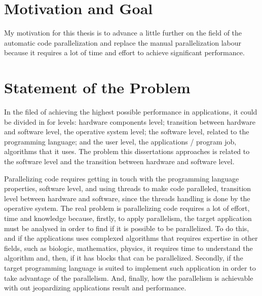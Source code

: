 
\section{Motivation and Goal} \label{sec:goals}

My motivation for this thesis is to advance a little further on the field of the automatic code parallelization  and replace the manual parallelization labour because it requires a lot of time and effort to achieve significant performance.



\section{Statement of the Problem}

In the filed of achieving the highest possible performance in applications, it could be divided in for levels: hardware components level; transition between hardware and software level, the operative system level; the software level, related to the programming language; and the user level, the applications / program job, algorithms that it uses. The problem this dissertations approaches is related to the software level and the transition between hardware and software level.

Parallelizing code requires getting in touch with the programming language properties, software level, and using threads to make code paralleled, transition level between hardware and software,  since the threads handling is done by the operative system. The real problem is parallelizing code requires a lot of effort, time and knowledge because, firstly,  to apply parallelism, the target application must be analysed in order to find if it is possible to be parallelized. To do this, and if the applications uses complexed algorithms that requires expertise in other fields, such as biologic, mathematics, physics, it requires time to understand the algorithm and, then, if it has blocks that can be parallelized. Secondly, if the target programming language is suited to implement such application in order to take advantage of the parallelism. And, finally, how the parallelism is achievable with out jeopardizing applications result and performance.


